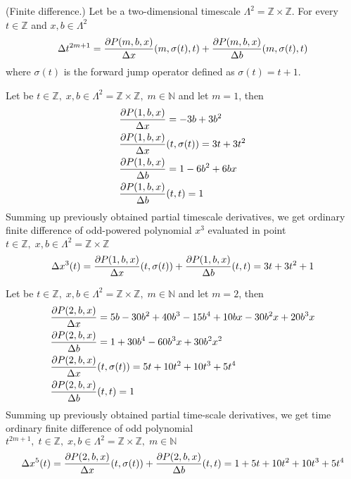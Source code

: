 \begin{cor}
    \label{finite_difference_case}
    (Finite difference.)
    Let be a two-dimensional timescale
    $\Lambda^2 = \mathbb{Z} \times \mathbb{Z}$.
    For every $t\in\mathbb{Z}$ and $x,b\in \Lambda^2$
    \[
        \Delta t^{2m+1}
        = \frac{\partial P ( m, b, x )}{\Delta x} (m, \sigma(t), t)
        + \frac{\partial P ( m, b, x )}{\Delta b}(m, \sigma(t), t)
    \]
    where $\sigma(t)$ is the forward jump operator defined as $\sigma(t) = t+1$.
\end{cor}
\begin{examp}
    \label{time_scale_z_example_1}
    Let be $t \in \mathbb{Z}, \; x,b \in \Lambda^2 = \mathbb{Z} \times \mathbb{Z}, \; m\in\mathbb{N}$ and let $m=1$, then
    \begin{align*}
        &\frac{\partial P ( 1, b, x )}{\Delta x}                = -3 b + 3 b^2 \\
        &\frac{\partial P ( 1, b, x )}{\Delta x} (t, \sigma(t)) = 3 t + 3 t^2 \\
        &\frac{\partial P ( 1, b, x )}{\Delta b}                = 1 - 6 b^2 + 6 b x \\
        &\frac{\partial P ( 1, b, x )}{\Delta b}(t,t)           = 1
    \end{align*}
    Summing up previously obtained partial timescale derivatives, we get ordinary finite difference of odd-powered polynomial
    $x^{3}$ evaluated in point $ t\in\mathbb{Z}, \; x,b\in\Lambda^2 = \mathbb{Z} \times \mathbb{Z}$
    \begin{align*}
        \Delta x^{3}(t)
        = \frac{\partial P ( 1, b, x )}{\Delta x} (t, \sigma(t))
        + \frac{\partial P ( 1, b, x )}{\Delta b}(t,t)
        = 3 t + 3 t^2 + 1
    \end{align*}
\end{examp}
\begin{examp}
    \label{time_scale_z_example_2}
    Let be $t\in\mathbb{Z}, \;x,b\in\Lambda^2 = \mathbb{Z} \times \mathbb{Z}, \; m\in\mathbb{N}$
    and let $m=2$, then
    \begin{align*}
        &\frac{\partial P ( 2, b, x )}{\Delta x}                = 5 b - 30 b^2 + 40 b^3 - 15 b^4 + 10 b x - 30 b^2 x + 20 b^3 x \\
        &\frac{\partial P ( 2, b, x )}{\Delta b}                = 1 + 30 b^4 - 60 b^3 x + 30 b^2 x^2 \\
        &\frac{\partial P ( 2, b, x )}{\Delta x} (t, \sigma(t)) = 5 t + 10 t^2 + 10 t^3 + 5 t^4 \\
        &\frac{\partial P ( 2, b, x )}{\Delta b} (t, t)         = 1
    \end{align*}
    Summing up previously obtained partial time-scale derivatives, we get time ordinary finite difference of odd polynomial
    $t^{2m+1}, \; t\in\mathbb{Z}, \;x,b\in\Lambda^2 = \mathbb{Z} \times \mathbb{Z}, \; m\in\mathbb{N}$
    \begin{align*}
        \Delta x^{5} (t)
        = \frac{\partial P ( 2, b, x )}{\Delta x} (t, \sigma(t))
        + \frac{\partial P ( 2, b, x )}{\Delta b} (t, t)
        = 1 + 5 t + 10 t^2 + 10 t^3 + 5 t^4
    \end{align*}
\end{examp}
